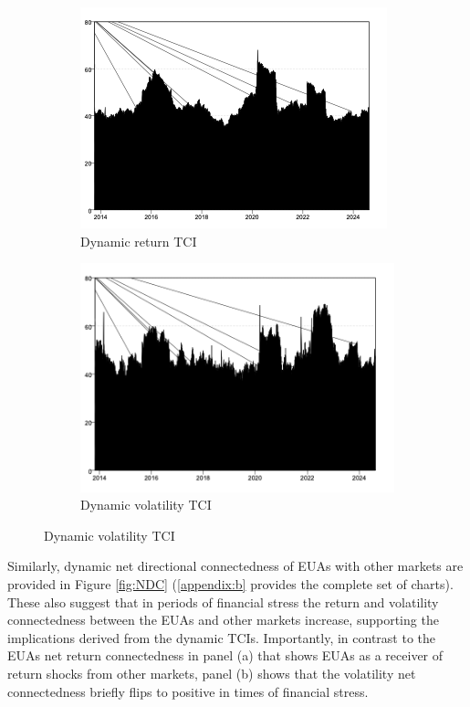 \documentclass[preprint, 3p,
authoryear]{elsarticle} %
\begin{document}
\begin{figure}[H]
  \caption{Dynamic Return and Volatility Connectedness (Jan 2013 – Aug 2024)}
  \label{fig:dynTCI}
      \begin{subfigure}[b]{\textwidth}
        \centering
        \caption{Dynamic return TCI}
        \label{fig:dynretTCI}
        \includegraphics[width = 0.5\linewidth]{2a-DynRetTCI}
      \end{subfigure}
      \begin{subfigure}[b]{\textwidth}
        \centering
        \bigskip
        \caption{Dynamic volatility TCI}
        \label{fig:dynvolTCI}
        \includegraphics[width = 0.5\linewidth]{2b-DynVolTCI}
      \end{subfigure}
\end{figure}

Similarly, dynamic net directional connectedness of EUAs with other
markets are provided in Figure \ref{fig:NDC} (\ref{appendix:b} provides
the complete set of charts). These also suggest that in periods of
financial stress the return and volatility connectedness between the
EUAs and other markets increase, supporting the implications derived
from the dynamic TCIs. Importantly, in contrast to the EUAs net return
connectedness in panel (a) that shows EUAs as a receiver of return
shocks from other markets, panel (b) shows that the volatility net
connectedness briefly flips to positive in times of financial stress.
\end{document}
